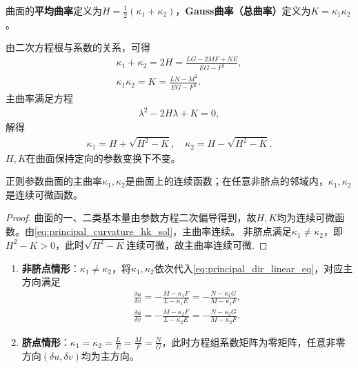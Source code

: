 \documentclass[../../main.tex]{subfiles}%
\begin{document}
\begin{definition}
曲面的\textbf{平均曲率}定义为$H=\frac{1}{2}(\kappa_1+\kappa_2)$，\textbf{Gauss曲率（总曲率）}定义为$K=\kappa_1\kappa_2$。
\end{definition}

由二次方程根与系数的关系，可得
\begin{align}
\kappa_1+\kappa_2=2H=\frac{LG-2MF+NE}{EG-F^2},\label{eq:mean_curvature_formula}\\
\kappa_1\kappa_2=K=\frac{LN-M^2}{EG-F^2}.\label{eq:gauss_curvature_formula}
\end{align}
主曲率满足方程
\begin{align}
\lambda^2-2H\lambda+K=0,\label{eq:principal_curvature_hk_eq}
\end{align}
解得
\begin{align}
\kappa_1=H+\sqrt{H^2-K},\quad \kappa_2=H-\sqrt{H^2-K}.\label{eq:principal_curvature_hk_sol}
\end{align}
$H,K$在曲面保持定向的参数变换下不变。

\begin{theorem}
正则参数曲面的主曲率$\kappa_1,\kappa_2$是曲面上的连续函数；在任意非脐点的邻域内，$\kappa_1,\kappa_2$是连续可微函数。
\end{theorem}
\begin{proof}

曲面的一、二类基本量由参数方程二次偏导得到，故$H,K$均为连续可微函数。由\eqref{eq:principal_curvature_hk_sol}，主曲率连续。
非脐点满足$\kappa_1\neq\kappa_2$，即$H^2-K>0$，此时$\sqrt{H^2-K}$连续可微，故主曲率连续可微.

\end{proof}


\begin{enumerate}[(1)]
\item \textbf{非脐点情形}：$\kappa_1\neq\kappa_2$，将$\kappa_1,\kappa_2$依次代入\eqref{eq:principal_dir_linear_eq}，对应主方向满足
\begin{align}
\frac{\delta u}{\delta v}=-\frac{M-\kappa_1F}{L-\kappa_1E}=-\frac{N-\kappa_1G}{M-\kappa_1F},\label{eq:principal_dir_k1}\\
\frac{\delta u}{\delta v}=-\frac{M-\kappa_2F}{L-\kappa_2E}=-\frac{N-\kappa_2G}{M-\kappa_2F}.\label{eq:principal_dir_k2}
\end{align}
\item \textbf{脐点情形}：$\kappa_1=\kappa_2=\frac{L}{E}=\frac{M}{F}=\frac{N}{G}$，此时方程组系数矩阵为零矩阵，任意非零方向$(\delta u,\delta v)$均为主方向。
\end{enumerate}
\end{document}
